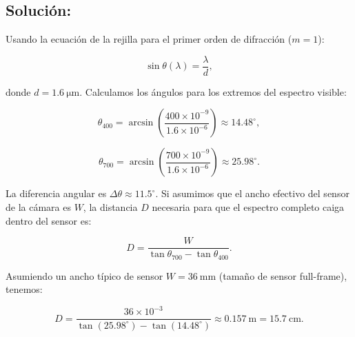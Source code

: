 \documentclass[11pt]{article}
\begin{document}
\subsection*{Solución:}

Usando la ecuación de la rejilla para el primer orden de difracción (\(m=1\)):

\[
\sin\theta(\lambda) = \frac{\lambda}{d},
\]

donde \(d = \SI{1.6}{\micro\metre}\). Calculamos los ángulos para los extremos del espectro visible:

\[
\theta_{400} = \arcsin\left(\frac{400 \times 10^{-9}}{1.6 \times 10^{-6}}\right) \approx 14.48^\circ,
\]

\[
\theta_{700} = \arcsin\left(\frac{700 \times 10^{-9}}{1.6 \times 10^{-6}}\right) \approx 25.98^\circ.
\]

La diferencia angular es \(\Delta\theta \approx 11.5^\circ\). Si asumimos que el ancho efectivo del sensor de la cámara es \(W\), la distancia \(D\) necesaria para que el espectro completo caiga dentro del sensor es:

\[
D = \frac{W}{\tan\theta_{700} - \tan\theta_{400}}.
\]

Asumiendo un ancho típico de sensor \(W = \SI{36}{\milli\metre}\) (tamaño de sensor full-frame), tenemos:

\[
D = \frac{36 \times 10^{-3}}{\tan(25.98^\circ) - \tan(14.48^\circ)} \approx \SI{0.157}{\metre} = \SI{15.7}{\centi\metre}.
\]
\end{document}
